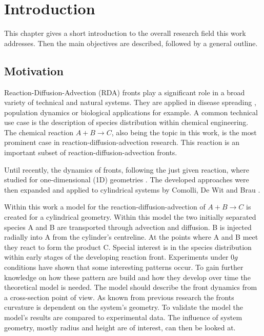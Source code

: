\documentclass[../thesis.tex]{subfiles}
\begin{document}
\chapter{Introduction}
\label{chp:introduction}

This chapter gives a short introduction to the overall research field this work addresses. Then the main objectives are described, followed by a general outline. 

\section{Motivation}


Reaction-Diffusion-Advection (RDA) fronts play a significant role in a broad variety of technical and natural systems. They are applied in disease spreading \cite{kuto2017concentration}, population dynamics \cite{chen2018hopf, wang2019persistence} or biological applications \cite{zhao2011operator} for example. A common technical use case is the description of species distribution \cite{nakagaki1999reaction, von2013measurement} within chemical engineering. The chemical reaction $ A+B \rightarrow C$, also being the topic in this work, is the most prominent case in reaction-diffusion-advection research. This reaction is an important subset of reaction-diffusion-advection fronts.

Until recently, the dynamics of fronts, following the just given reaction, where studied for one-dimensional (1D) geometries \cite{PhysRevA.38.3151}. The developed approaches were then expanded and applied to cylindrical systems by Comolli, De Wit and Brau \cite{comolli2021dynamics}.

Within this work a model for the reaction-diffusion-advection of $ A+B \rightarrow C$ is created for a cylindrical geometry. Within this model the two initially separated species A and B are transported through advection and diffusion. B is injected radially into A from the cylinder's centreline. At the points where A and B meet they react to form the product C. Special interest is in the species distribution within early stages of the developing reaction front. Experiments under $ 0g$ conditions have shown that some interesting patterns occur. To gain further knowledge on how these pattern are build and how they develop over time the theoretical model is needed. The model should describe the front dynamics from a cross-section point of view. As known from previous research the fronts curvature is dependent on the system's geometry. To validate the model the model's results are compared to experimental data. The influence of system geometry, mostly radius and height are of interest, can then be looked at. 
\end{document}
